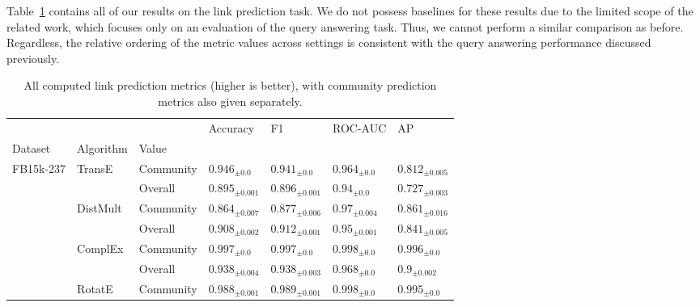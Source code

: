 Table~\ref{tab:performance_link_prediction} contains all of our results on the link prediction task. We do not possess baselines for these results due to the limited scope of the related work, which focuses only on an evaluation of the query answering task. Thus, we cannot perform a similar comparison as before. Regardless, the relative ordering of the metric values across settings is consistent with the query answering performance discussed previously.

\begin{table}[ht!]
  \caption[All computed link prediction metrics.]{All computed link prediction metrics (higher is better), with community prediction metrics also given separately.}
  \label{tab:performance_link_prediction}
  \centering
    \begin{adjustbox}{width=\textwidth}%
\begin{tabular}{lllllll}
\toprule
         &           &         &                 Accuracy &                       F1 &                  ROC-AUC &                       AP \\
Dataset & Algorithm & Value &                          &                          &                          &                          \\
\midrule
FB15k-237 & TransE & Community &    ${{0.946}_{\pm 0.0}}$ &    ${{0.941}_{\pm 0.0}}$ &    ${{0.964}_{\pm 0.0}}$ &  ${{0.812}_{\pm 0.005}}$ \\
         &           & Overall &  ${{0.895}_{\pm 0.001}}$ &  ${{0.896}_{\pm 0.001}}$ &     ${{0.94}_{\pm 0.0}}$ &  ${{0.727}_{\pm 0.003}}$ \\
         & DistMult & Community &  ${{0.864}_{\pm 0.007}}$ &  ${{0.877}_{\pm 0.006}}$ &   ${{0.97}_{\pm 0.004}}$ &  ${{0.861}_{\pm 0.016}}$ \\
         &           & Overall &  ${{0.908}_{\pm 0.002}}$ &  ${{0.912}_{\pm 0.001}}$ &   ${{0.95}_{\pm 0.001}}$ &  ${{0.841}_{\pm 0.005}}$ \\
         & ComplEx & Community &    ${{0.997}_{\pm 0.0}}$ &    ${{0.997}_{\pm 0.0}}$ &    ${{0.998}_{\pm 0.0}}$ &    ${{0.996}_{\pm 0.0}}$ \\
         &           & Overall &  ${{0.938}_{\pm 0.004}}$ &  ${{0.938}_{\pm 0.003}}$ &    ${{0.968}_{\pm 0.0}}$ &    ${{0.9}_{\pm 0.002}}$ \\
         & RotatE & Community &  ${{0.988}_{\pm 0.001}}$ &  ${{0.989}_{\pm 0.001}}$ &    ${{0.998}_{\pm 0.0}}$ &    ${{0.995}_{\pm 0.0}}$ \\

\end{tabular}
\end{adjustbox}
\end{table}
